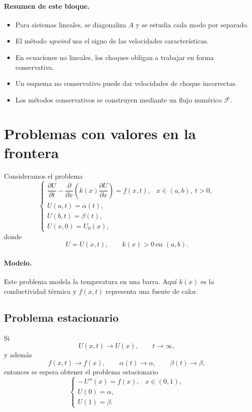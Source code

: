 \paragraph{Resumen de este bloque.}
\begin{itemize}
    \item Para sistemas lineales, se diagonaliza \(A\) y se estudia cada modo por separado.
    \item El método \emph{upwind} usa el signo de las velocidades características.
    \item En ecuaciones no lineales, los choques obligan a trabajar en forma conservativa.
    \item Un esquema no conservativo puede dar velocidades de choque incorrectas.
    \item Los métodos conservativos se construyen mediante un flujo numérico \(\mathcal{F}\).
\end{itemize}

\section{Problemas con valores en la frontera}

Consideramos el problema
\[
\begin{cases}
\dfrac{\partial U}{\partial t}
-
\dfrac{\partial}{\partial x}\!\left(k(x)\dfrac{\partial U}{\partial x}\right)
=
f(x,t),
& x\in(a,b),\ t>0,\\[8pt]
U(a,t)=\alpha(t),\\
U(b,t)=\beta(t),\\
U(x,0)=U_0(x),
\end{cases}
\]
donde
\[
U=U(x,t),
\qquad
k(x)>0 \ \text{en }(a,b).
\]

\paragraph{Modelo.}
Este problema modela la temperatura en una barra. Aquí \(k(x)\) es la conductividad térmica y \(f(x,t)\) representa una fuente de calor.

\subsection{Problema estacionario}

Si
\[
U(x,t)\longrightarrow U(x), \qquad t\to\infty,
\]
y además
\[
f(x,t)\to f(x),\qquad
\alpha(t)\to \alpha,\qquad
\beta(t)\to \beta,
\]
entonces se espera obtener el problema estacionario
\[
\begin{cases}
-\,U''(x)=f(x), & x\in(0,1),\\[4pt]
U(0)=\alpha,\\
U(1)=\beta.
\end{cases}
\]

